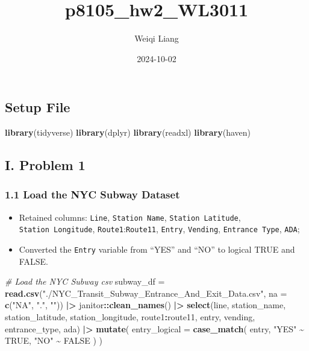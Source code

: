 \documentclass[
]{article}
\title{p8105\_hw2\_WL3011}
\author{Weiqi Liang}
\date{2024-10-02}
\newenvironment{Shaded}{\begin{snugshade}}{\end{snugshade}}
\newcommand{\AttributeTok}[1]{\textcolor[rgb]{0.13,0.29,0.53}{#1}}
\newcommand{\CommentTok}[1]{\textcolor[rgb]{0.56,0.35,0.01}{\textit{#1}}}
\newcommand{\ConstantTok}[1]{\textcolor[rgb]{0.56,0.35,0.01}{#1}}
\newcommand{\FunctionTok}[1]{\textcolor[rgb]{0.13,0.29,0.53}{\textbf{#1}}}
\newcommand{\NormalTok}[1]{#1}
\newcommand{\OtherTok}[1]{\textcolor[rgb]{0.56,0.35,0.01}{#1}}
\newcommand{\SpecialCharTok}[1]{\textcolor[rgb]{0.81,0.36,0.00}{\textbf{#1}}}
\newcommand{\StringTok}[1]{\textcolor[rgb]{0.31,0.60,0.02}{#1}}
\providecommand{\tightlist}{%
  \setlength{\itemsep}{0pt}\setlength{\parskip}{0pt}}
\begin{document}
\maketitle

\subsection{Setup File}\label{setup-file}

\begin{Shaded}
\begin{Highlighting}[]
\FunctionTok{library}\NormalTok{(tidyverse)}
\FunctionTok{library}\NormalTok{(dplyr)}
\FunctionTok{library}\NormalTok{(readxl)}
\FunctionTok{library}\NormalTok{(haven)}
\end{Highlighting}
\end{Shaded}

\subsection{I. Problem 1}\label{i.-problem-1}

\subsubsection{1.1 Load the NYC Subway
Dataset}\label{load-the-nyc-subway-dataset}

\begin{itemize}
\tightlist
\item
  Retained columns: \texttt{Line}, \texttt{Station\ Name},
  \texttt{Station\ Latitude}, \texttt{Station\ Longitude},
  \texttt{Route1}:\texttt{Route11}, \texttt{Entry}, \texttt{Vending},
  \texttt{Entrance\ Type}, \texttt{ADA};
\item
  Converted the \texttt{Entry} variable from ``YES'' and ``NO'' to
  logical TRUE and FALSE.
\end{itemize}

\begin{Shaded}
\begin{Highlighting}[]
\CommentTok{\# Load the NYC Subway csv}
\NormalTok{subway\_df }\OtherTok{=} 
  \FunctionTok{read.csv}\NormalTok{(}\StringTok{"./NYC\_Transit\_Subway\_Entrance\_And\_Exit\_Data.csv"}\NormalTok{, }
           \AttributeTok{na =} \FunctionTok{c}\NormalTok{(}\StringTok{"NA"}\NormalTok{, }\StringTok{"."}\NormalTok{, }\StringTok{""}\NormalTok{)) }\SpecialCharTok{|\textgreater{}}
\NormalTok{  janitor}\SpecialCharTok{::}\FunctionTok{clean\_names}\NormalTok{() }\SpecialCharTok{|\textgreater{}}
  \FunctionTok{select}\NormalTok{(line, station\_name, station\_latitude, station\_longitude,}
\NormalTok{         route1}\SpecialCharTok{:}\NormalTok{route11, entry, vending, entrance\_type, ada) }\SpecialCharTok{|\textgreater{}}
  \FunctionTok{mutate}\NormalTok{(}
    \AttributeTok{entry\_logical =} \FunctionTok{case\_match}\NormalTok{(}
\NormalTok{      entry, }
      \StringTok{"YES"} \SpecialCharTok{\textasciitilde{}} \ConstantTok{TRUE}\NormalTok{,}
      \StringTok{"NO"}  \SpecialCharTok{\textasciitilde{}} \ConstantTok{FALSE}
\NormalTok{      )}
\NormalTok{    )}
\end{Highlighting}
\end{Shaded}
\end{document}
